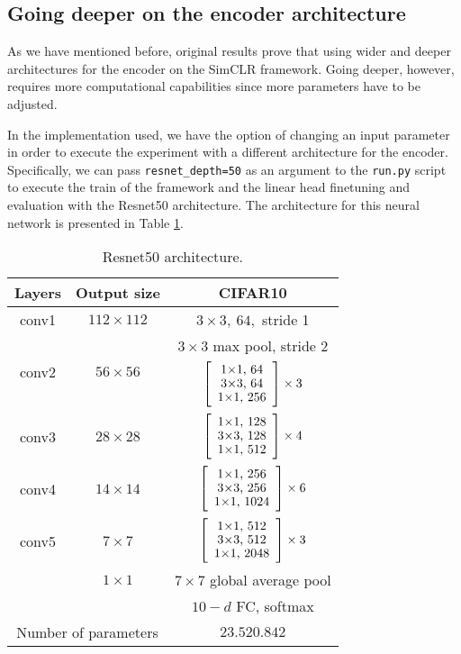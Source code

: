 \subsection{Going deeper on the encoder architecture}
\label{experiments:simclr:second}


As we have mentioned before, original results prove that using wider and deeper architectures for the encoder on the SimCLR framework. Going deeper, however, requires more computational capabilities since more parameters have to be adjusted.

In the implementation used, we have the option of changing an input parameter in order to execute the experiment with a different architecture for the encoder. Specifically, we can pass \lstinline{resnet_depth=50} as an argument to the \lstinline{run.py} script to execute the train of the framework and the linear head finetuning and evaluation with the Resnet50 architecture. The architecture for this neural network is presented in Table \ref{table:resnet:50}.


\begin{table}[H]
    \centering
    \begin{tabular}{|c|c|c|}
    \hline
    Layers                 & Output size                    & CIFAR10                         \\ \hline
    conv1                  & $112\times112$                 & $3\times3, \ 64,$ stride 1      \\ \hline
    \multirow{2}{*}{conv2} & \multirow{2}{*}{$56\times 56$} & $3\times3$ max pool, stride 2   \\ \cline{3-3} 
                           &                                & $\blockb{256}{64}{3}$           \\ \hline
    conv3                  & $28 \times 28$                 & $\blockb{512}{128}{4}$          \\ \hline
    conv4                  & $14 \times 14$                 & $\blockb{1024}{256}{6}$         \\ \hline
    conv5                  & $7 \times 7$                   & $\blockb{2048}{512}{3}$         \\ \hline
    \multirow{2}{*}{}      & $1\times 1$                    & $7\times 7$ global average pool \\ \cline{2-3} 
                           &                                & $10-d$ FC, softmax              \\ \hline
    \multicolumn{2}{|c|}{Number of parameters}              & $23.520.842$                    \\ \hline
    \end{tabular}
    \caption{Resnet50 architecture.}
    \label{table:resnet:50}
\end{table}

